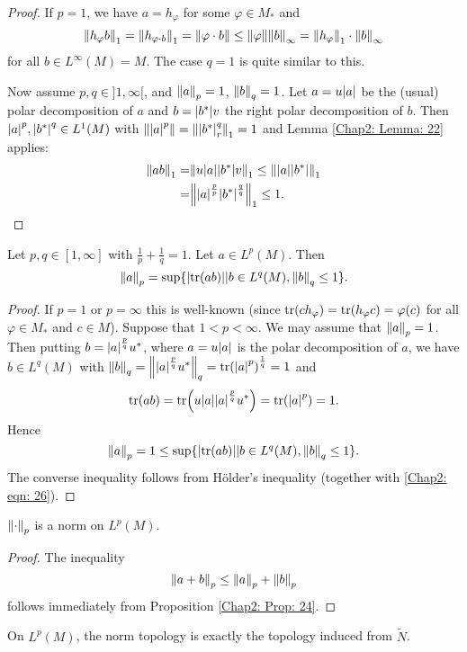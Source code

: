 \begin{proof}
    If $p=1$, we have $a=h_\varphi$ for some $\varphi\in M_*$ and 
\[
    \norm{h_\varphi b}_1=\norm{h_{\varphi\cdot b}}_1=\norm{\varphi\cdot b}\leq \norm{\varphi}\norm{b}_\infty=\norm{h_\varphi}_1\cdot \norm{b}_\infty
\]
for all $b\in L^\infty(M)=M$. The case $q=1$ is quite similar to this.\par
Now assume $p,q\in ]1,\infty[$, and $\norm{a}_p=1$, $\norm{b}_q=1$. Let $a=u\abs{a}$ be the (usual) polar decomposition of $a$ and $b=\abs{b^*}v$ the right polar decomposition of $b$. Then $\abs{a}^p, \abs{b^*}^q\in L^1(M)$ with $\norm{\abs{a}^p}=\norm{\abs{b^*}_r^q}_1=1$ and Lemma \ref{Chap2: Lemma: 22} applies:
\[
    \begin{split}
        \norm{ab}_1=&\norm{u\abs{a}\abs{b^*}v}_1\leq \norm{\abs{a}\abs{b^*}}_1\\
        =&\norm{\abs{a}^\frac{p}{p}\abs{b^*}^\frac{q}{q}}_1\leq 1.
    \end{split}
\]
\end{proof}
\begin{proposition}\label{Chap2: Prop: 24}
    Let $p,q\in [1,\infty]$ with $\frac{1}{p}+\frac{1}{q}=1$. Let $a\in L^p(M)$. Then 
    \[
        \norm{a}_p=\sup\{\abs{\tr(ab)}|b\in L^q(M),\norm{b}_q\leq 1\}.
    \]
\end{proposition}
\begin{proof}
    If $p=1$ or $p=\infty$ this is well-known (since $\tr(ch_\varphi)=\tr(h_\varphi c)=\varphi(c)$ for all $\varphi\in M_*$ and $c\in M$). Suppose that $1<p<\infty$. We may assume that $\norm{a}_p=1$. Then putting $b=\abs{a}^\frac{p}{q}u^*$, where $a=u\abs{a}$ is the polar decomposition of $a$, we have $b\in L^q(M)$ with $\norm{b}_q=\norm{\abs{a}^\frac{p}{q}u^*}_q=\tr(\abs{a}^p)^\frac{1}{q}=1$ and  
    \[
        \tr(ab)=\tr(u\abs{a}\abs{a}^\frac{p}{q}u^*)=\tr(\abs{a}^p)=1.
    \]  
Hence 
\[
   \norm{a}_p=1\leq \sup\{\abs{\tr(ab)}|b\in L^q(M),\norm{b}_q\leq 1\}.
\]
The converse inequality follows from H\"older's inequality (together with \eqref{Chap2: eqn: 26}). 
\end{proof}
\begin{corollary}
    $\norm{\cdot}_p$ is a norm on $L^p(M)$.
\end{corollary}
\begin{proof}
    The inequality 
\[
    \norm{a+b}_p\leq \norm{a}_p+\norm{b}_p
\]
    follows immediately from Proposition \ref{Chap2: Prop: 24}.
\end{proof}
\begin{proposition}
    On $L^p(M)$, the norm topology is exactly the topology induced from $\tilde{N}$. 
\end{proposition}
